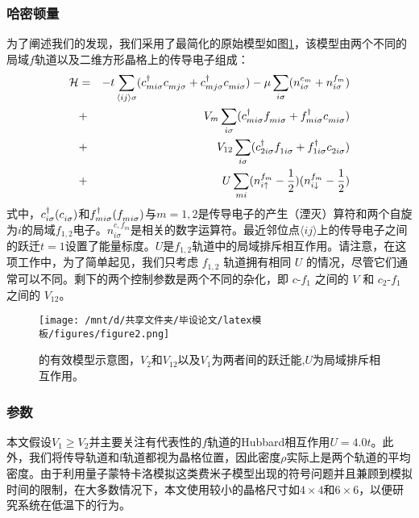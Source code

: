 \subsubsection{哈密顿量}
为了阐述我们的发现，我们采用了最简化的原始模型如图\ref{fig4.1.1}，该模型由两个不同的局域$f$轨道以及二维方形晶格上的传导电子组成：
\begin{eqnarray}
    {\cal H} &=& - t \sum\limits_{\langle ij \rangle \sigma}
(c^{\dagger}_{mi\sigma}c_{mj\sigma}^{\vphantom{dagger}}
+c^{\dagger}_{mj\sigma}c_{mi\sigma}^{\vphantom{dagger}})
- \mu \sum\limits_{i\sigma} (n^{c_m}_{i\sigma}+ n^{f_m}_{i\sigma} )  \nonumber \\
&+& V_m \sum\limits_{i \sigma}  (c^{\dagger}_{mi\sigma}f_{mi\sigma}^{\vphantom{dagger}}+ f^{\dagger}_{mi\sigma}c_{mi\sigma}^{\vphantom{dagger}}) \nonumber \\
 &+& V_{12} \sum\limits_{i \sigma}  (c^{\dagger}_{2i\sigma}f_{1i\sigma}^{\vphantom{dagger}}+ f^{\dagger}_{1i\sigma}c_{2i\sigma}^{\vphantom{dagger}}) \nonumber \\
    &+& U \sum\limits_{mi} (n^{f_m}_{i\uparrow}-\frac{1}{2}) (n^{f_m}_{i\downarrow}-\frac{1}{2})
\nonumber
\end{eqnarray}
式中，$c^{\dagger}_{i\sigma}(c_{i\sigma}^{\vphantom{dagger}})$和$f^{\dagger}_{mi\sigma}(f_{mi\sigma}^{\vphantom{dagger}})$与$m=1,2$是传导电子的产生（湮灭）算符和两个自旋为$i$的局域$f_{1,2}$电子。$n^{c,f_m}_{i\sigma}$是相关的数字运算符。最近邻位点$\langle ij \rangle$上的传导电子之间的跃迁$t=1$设置了能量标度。$U$是$f_{1,2}$轨道中的局域排斥相互作用。请注意，在这项工作中，为了简单起见，我们只考虑 $f_{1,2}$ 轨道拥有相同 $U$ 的情况，尽管它们通常可以不同。剩下的两个控制参数是两个不同的杂化，即 $c$-$f_1$ 之间的 $V$ 和 $c_2$-$f_1$ 之间的 $V_{12}$。
\begin{figure}[h]
    \centering
    \texttt{[image: /mnt/d/共享文件夹/毕设论文/latex模板/figures/figure2.png]}
    \caption{的有效模型示意图，$V_2$和$V_{12}$以及$V_1$为两者间的跃迁能,$U$为局域排斥相互作用。}
    \label{fig4.1.1}
\end{figure}

\subsubsection{参数}
本文假设$V_1 \geqslant V_2$并主要关注有代表性的$f$轨道的Hubbard相互作用$U=4.0t$。此外，我们将传导轨道和f轨道都视为晶格位置，因此密度$\rho$实际上是两个轨道的平均密度。由于利用量子蒙特卡洛模拟这类费米子模型出现的符号问题并且兼顾到模拟时间的限制，在大多数情况下，本文使用较小的晶格尺寸如$4 \times 4$和$6 \times 6$，以便研究系统在低温下的行为。

